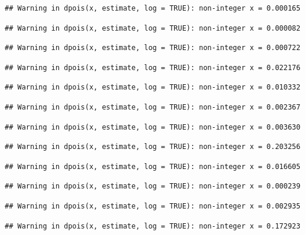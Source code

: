 \documentclass[]{article}
\begin{document}
\begin{verbatim}
## Warning in dpois(x, estimate, log = TRUE): non-integer x = 0.000165
\end{verbatim}

\begin{verbatim}
## Warning in dpois(x, estimate, log = TRUE): non-integer x = 0.000082
\end{verbatim}

\begin{verbatim}
## Warning in dpois(x, estimate, log = TRUE): non-integer x = 0.000722
\end{verbatim}

\begin{verbatim}
## Warning in dpois(x, estimate, log = TRUE): non-integer x = 0.022176
\end{verbatim}

\begin{verbatim}
## Warning in dpois(x, estimate, log = TRUE): non-integer x = 0.010332
\end{verbatim}

\begin{verbatim}
## Warning in dpois(x, estimate, log = TRUE): non-integer x = 0.002367
\end{verbatim}

\begin{verbatim}
## Warning in dpois(x, estimate, log = TRUE): non-integer x = 0.003630
\end{verbatim}

\begin{verbatim}
## Warning in dpois(x, estimate, log = TRUE): non-integer x = 0.203256
\end{verbatim}

\begin{verbatim}
## Warning in dpois(x, estimate, log = TRUE): non-integer x = 0.016605
\end{verbatim}

\begin{verbatim}
## Warning in dpois(x, estimate, log = TRUE): non-integer x = 0.000239
\end{verbatim}

\begin{verbatim}
## Warning in dpois(x, estimate, log = TRUE): non-integer x = 0.002935
\end{verbatim}

\begin{verbatim}
## Warning in dpois(x, estimate, log = TRUE): non-integer x = 0.172923
\end{verbatim}
\end{document}
